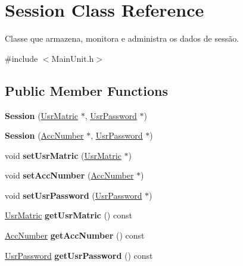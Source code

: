 \hypertarget{classSession}{\section{Session Class Reference}
\label{de/d41/classSession}
}


Classe que armazena, monitora e administra os dados de sessão.  




{\ttfamily \#include $<$Main\-Unit.\-h$>$}

\subsection*{Public Member Functions}
\begin{DoxyCompactItemize}
\item 
\hypertarget{classSession_a216a4f17b0c16bd7e2e5ace3c5500efa}{{\bfseries Session} (\hyperlink{classUsrMatric}{Usr\-Matric} $\ast$, \hyperlink{classUsrPassword}{Usr\-Password} $\ast$)}\label{de/d41/classSession_a216a4f17b0c16bd7e2e5ace3c5500efa}

\item 
\hypertarget{classSession_ad94e7557f00ffe2abd64acf12d6f79d4}{{\bfseries Session} (\hyperlink{classAccNumber}{Acc\-Number} $\ast$, \hyperlink{classUsrPassword}{Usr\-Password} $\ast$)}\label{de/d41/classSession_ad94e7557f00ffe2abd64acf12d6f79d4}

\item 
\hypertarget{classSession_a8aff9f54e6d36a716794e7477820dc72}{void {\bfseries set\-Usr\-Matric} (\hyperlink{classUsrMatric}{Usr\-Matric} $\ast$)}\label{de/d41/classSession_a8aff9f54e6d36a716794e7477820dc72}

\item 
\hypertarget{classSession_a350981c1ca9d9eb3e3b78495a84a3acd}{void {\bfseries set\-Acc\-Number} (\hyperlink{classAccNumber}{Acc\-Number} $\ast$)}\label{de/d41/classSession_a350981c1ca9d9eb3e3b78495a84a3acd}

\item 
\hypertarget{classSession_a0c2ea92fd94940c314e6d5728bbe3725}{void {\bfseries set\-Usr\-Password} (\hyperlink{classUsrPassword}{Usr\-Password} $\ast$)}\label{de/d41/classSession_a0c2ea92fd94940c314e6d5728bbe3725}

\item 
\hypertarget{classSession_ab652b031c32df3f5c3c6ff4011477be9}{\hyperlink{classUsrMatric}{Usr\-Matric} {\bfseries get\-Usr\-Matric} () const }\label{de/d41/classSession_ab652b031c32df3f5c3c6ff4011477be9}

\item 
\hypertarget{classSession_a3b3e2fbabef41e2040cc1bfc7a206bc3}{\hyperlink{classAccNumber}{Acc\-Number} {\bfseries get\-Acc\-Number} () const }\label{de/d41/classSession_a3b3e2fbabef41e2040cc1bfc7a206bc3}

\item 
\hypertarget{classSession_a6907e9cd690bbe1d6d36c276687d5816}{\hyperlink{classUsrPassword}{Usr\-Password} {\bfseries get\-Usr\-Password} () const }\label{de/d41/classSession_a6907e9cd690bbe1d6d36c276687d5816}

\end{DoxyCompactItemize}


